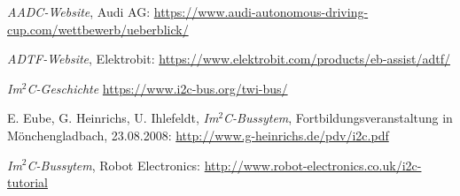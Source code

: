 \documentclass[12pt, a4paper]{scrartcl}
\begin{document}
\newpage
{}
\begin{thebibliography}{9}
	\textit{AADC-Website},
	Audi AG:
	\url{https://www.audi-autonomous-driving-cup.com/wettbewerb/ueberblick/}
	
	\textit{ADTF-Website},
	Elektrobit:
	\url{https://www.elektrobit.com/products/eb-assist/adtf/}
	
	\textit{Im$^2$C-Geschichte}
	\url{https://www.i2c-bus.org/twi-bus/}
	
	E. Eube, G. Heinrichs, U. Ihlefeldt,
	\textit{Im$^2$C-Bussytem},
	Fortbildungsveranstaltung in Mönchengladbach, 23.08.2008:
	\url{http://www.g-heinrichs.de/pdv/i2c.pdf}
	
	\textit{Im$^2$C-Bussytem},
	Robot Electronics:
	\url{http://www.robot-electronics.co.uk/i2c-tutorial}

\end{thebibliography}

\end{document}
